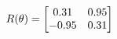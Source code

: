 \documentclass[preview]{standalone}
\begin{document}
\begin{align*}
\special{dvisvgm:raw <g id='unique000'>}R(\theta) = \begin{bmatrix}0.31 & 0.95\\-0.95 & 0.31\end{bmatrix}\special{dvisvgm:raw </g>}
\end{align*}
\end{document}
